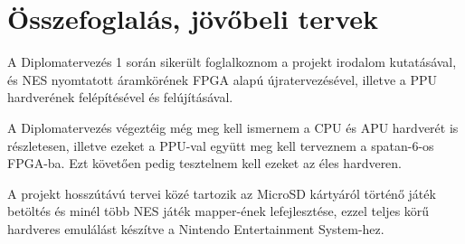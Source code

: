 \chapter{Összefoglalás, jövőbeli tervek}

A Diplomatervezés 1 során sikerült foglalkoznom a projekt irodalom kutatásával, és NES nyomtatott áramkörének FPGA alapú újratervezésével, illetve a PPU hardverének felépítésével és felújításával.

A Diplomatervezés végeztéig még meg kell ismernem a CPU és APU hardverét is részletesen, illetve ezeket a PPU-val együtt meg kell terveznem a spatan-6-os FPGA-ba. Ezt követően pedig tesztelnem kell ezeket az éles hardveren.

A projekt hosszútávú tervei közé tartozik az MicroSD kártyáról történő játék betöltés és minél több NES játék mapper-ének lefejlesztése, ezzel teljes körű hardveres emulálást készítve a Nintendo Entertainment System-hez. 